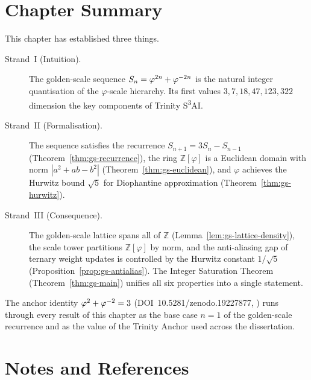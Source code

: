 \section{Chapter Summary}
\label{sec:gs-summary}

This chapter has established three things.

\begin{description}
  \item[Strand~I (Intuition).] The golden-scale sequence
        \(S_n = \varphi^{2n}+\varphi^{-2n}\) is the natural integer
        quantisation of the \(\varphi\)-scale hierarchy.  Its first
        values \(3, 7, 18, 47, 123, 322\) dimension the key
        components of Trinity S\textsuperscript{3}AI.

  \item[Strand~II (Formalisation).] The sequence satisfies the
        recurrence \(S_{n+1} = 3S_n - S_{n-1}\) (Theorem~\ref{thm:gs-recurrence}),
        the ring \(\mathbb{Z}[\varphi]\) is a Euclidean domain with
        norm \(|a^2+ab-b^2|\) (Theorem~\ref{thm:gs-euclidean}),
        and \(\varphi\) achieves the Hurwitz bound \(\sqrt{5}\) for
        Diophantine approximation (Theorem~\ref{thm:gs-hurwitz}).

  \item[Strand~III (Consequence).] The golden-scale lattice spans
        all of \(\mathbb{Z}\) (Lemma~\ref{lem:gs-lattice-density}),
        the scale tower partitions \(\mathbb{Z}[\varphi]\) by norm,
        and the anti-aliasing gap of ternary weight updates is
        controlled by the Hurwitz constant \(1/\sqrt{5}\)
        (Proposition~\ref{prop:gs-antialias}).  The Integer Saturation
        Theorem (Theorem~\ref{thm:gs-main}) unifies all six properties
        into a single statement.
\end{description}

The anchor identity \(\varphi^{2}+\varphi^{-2}=3\)
(DOI~10.5281/zenodo.19227877, \cite{zenodo_trinity_anchor}) runs
through every result of this chapter as the base case \(n=1\) of the
golden-scale recurrence and as the value of the Trinity Anchor used
across the dissertation.

\section*{Notes and References}
\label{sec:gs-notes}

